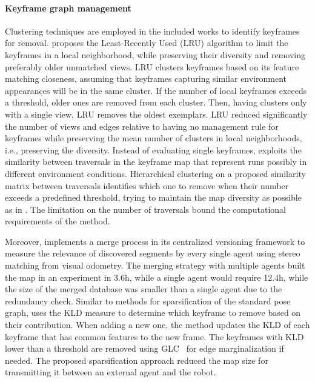 \paragraph{Keyframe graph management}

Clustering techniques are employed in the included works to identify keyframes for removal.
\cite{konolige-bowman:2009:5354121} proposes the Least-Recently Used (LRU) algorithm to limit the keyframes in a local neighborhood, while preserving their diversity and removing preferably older unmatched views. LRU clusters keyframes  based on its feature matching closeness, assuming that keyframes capturing similar environment appearances will be in the same cluster. If the number of local keyframes exceeds a threshold, older ones are removed from each cluster. Then, having clusters only with a single view, LRU removes the oldest exemplars. LRU reduced significantly the number of views and edges relative to having no management rule for keyframes while preserving the mean number of clusters in local neighborhoods, i.e., preserving the diversity.
Instead of evaluating single keyframes, \cite{bouaziz-et-al:2022:4} exploits the similarity between traversals in the keyframe map that represent runs possibly in different environment conditions. Hierarchical clustering on a proposed similarity matrix between traversals identifies which one to remove when their number exceeds a predefined threshold, trying to maintain the map diversity as possible as in \cite{konolige-bowman:2009:5354121}. The limitation on the number of traversals bound the computational requirements of the method.

Moreover, \cite{gadd-newman:2016:7759843} implements a merge process in its centralized versioning framework to measure the relevance of discovered segments by every single agent using stereo matching from visual odometry. The merging strategy with multiple agents built the map in an experiment in 3.6h, while a single agent would require 12.4h, while the size of the merged database was smaller than a single agent due to the redundancy check.
Similar to methods for sparsification of the standard pose graph, \cite{ding-et-al:2019:8968550} uses the KLD measure to determine which keyframe to remove based on their contribution. When adding a new one, the method updates the KLD of each keyframe that has common features to the new frame. The keyframes with KLD lower than a threshold are removed using GLC~\parencite{carlevaris-bianco-et-al:2014:2347571} for edge marginalization if needed. The proposed sparsification approach reduced the map size for transmitting it between an external agent and the robot.


